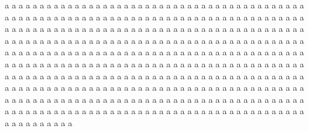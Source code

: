 
\physics

\begin{paperabs}
	
	a a a a a a a a a a a a a a a a a a a a a a a a a a a a a a a a a a a a a a a a a a a a a a a a a a a a a a a a a a a a a a a a a a a a a a a a a a a a a a a a a a a a a a a a a a a a a a a a a a a a a a a a a a a a a a a a a a a a a a a a a a a a a a a a a a a a a a a a a a a a a a a a a a a a a a a a a a a a a a a a a a a a a a a a a a a a a a a a a a a a a a a a a a a a a a a a a a a a a a a a a a a a a a a a a a a a a a a a a a a a a a a a a a a a a a a a a a a a a a a a a a a a a a a a a a a a a a a a a a a a a a a a a a a a a a a a a a a a a a a a a a a a a a a a a a a a a a a a a a a a a a a a a a a a a a a a a a a a a a a a a a a a a a a a a a a a a a a a a a a a a a a a a a a a a a a a a a a a a a a a a a a a a a a a a a a a a a a a a a a a a a a a a a a a a a a a a a a a a a a a a a a a a a a a a a a a a a a a a a a a a a a a a a a a a a a a a a a a a a a a 
	
\end{paperabs}

